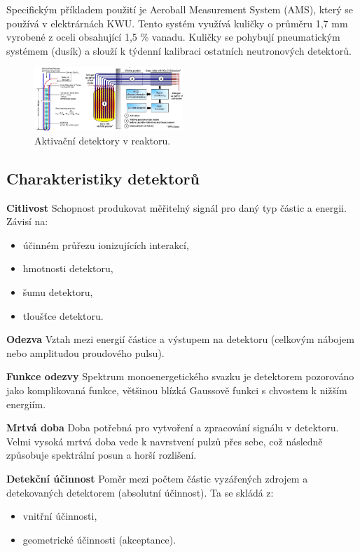 Specifickým příkladem použití je Aeroball Measurement System (AMS), který se používá v elektrárnách KWU. Tento systém využívá kuličky o průměru 1,7 mm vyrobené z oceli obsahující 1,5 \% vanadu. Kuličky se pohybují pneumatickým systémem (dusík) a slouží k týdenní kalibraci ostatních neutronových detektorů.

\begin{figure}[H] 
    \centering
    \includegraphics[width=0.5\textwidth]{img/AktivačníDetektory.png}
    \caption{Aktivační detektory v reaktoru.}
    \label{fig:AktivačníDetektory}
\end{figure}

\subsection{Charakteristiky detektorů}

\textbf{Citlivost} \textendash{} Schopnost produkovat měřitelný signál pro daný typ částic a energii. Závisí na:
\begin{itemize}
    \item účinném průřezu ionizujících interakcí,
    \item hmotnosti detektoru,
    \item šumu detektoru,
    \item tloušťce detektoru.
\end{itemize}

\textbf{Odezva} \textendash{} Vztah mezi energií částice a výstupem na detektoru (celkovým nábojem nebo amplitudou proudového pulsu).

\textbf{Funkce odezvy} \textendash{} Spektrum monoenergetického svazku je detektorem pozorováno jako komplikovaná funkce, většinou blízká Gaussově funkci s chvostem k nižším energiím.

\textbf{Mrtvá doba} \textendash{} Doba potřebná pro vytvoření a zpracování signálu v detektoru. Velmi vysoká mrtvá doba vede k navrstvení pulzů přes sebe, což následně způsobuje spektrální posun a horší rozlišení.

\textbf{Detekční účinnost} \textendash{} Poměr mezi počtem částic vyzářených zdrojem a detekovaných detektorem (absolutní účinnost). Ta se skládá z:
\begin{itemize}
    \item vnitřní účinnosti,
    \item geometrické účinnosti (akceptance).
\end{itemize}

